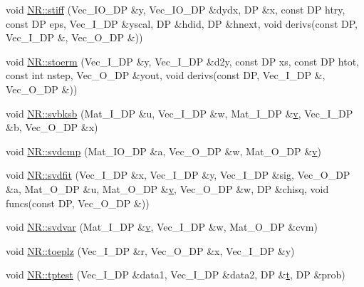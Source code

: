 \begin{DoxyCompactItemize}
\item 
void \mbox{\hyperlink{namespaceNR_afca47b534f9a096322597481b44a4ea6}{N\+R\+::stiff}} (Vec\+\_\+\+I\+O\+\_\+\+DP \&y, Vec\+\_\+\+I\+O\+\_\+\+DP \&dydx, DP \&x, const DP htry, const DP eps, Vec\+\_\+\+I\+\_\+\+DP \&yscal, DP \&hdid, DP \&hnext, void derivs(const DP, Vec\+\_\+\+I\+\_\+\+DP \&, Vec\+\_\+\+O\+\_\+\+DP \&))
\item 
void \mbox{\hyperlink{namespaceNR_a9a4beb20936c6e96b577a4f5e8c9d157}{N\+R\+::stoerm}} (Vec\+\_\+\+I\+\_\+\+DP \&y, Vec\+\_\+\+I\+\_\+\+DP \&d2y, const DP xs, const DP htot, const int nstep, Vec\+\_\+\+O\+\_\+\+DP \&yout, void derivs(const DP, Vec\+\_\+\+I\+\_\+\+DP \&, Vec\+\_\+\+O\+\_\+\+DP \&))
\item 
void \mbox{\hyperlink{namespaceNR_a5ae2173a7b10fd0f4e35baaad45f16f8}{N\+R\+::svbksb}} (Mat\+\_\+\+I\+\_\+\+DP \&u, Vec\+\_\+\+I\+\_\+\+DP \&w, Mat\+\_\+\+I\+\_\+\+DP \&\mbox{\hyperlink{adat__devel_2lib_2hadron_2hadron__timeslice_8cc_a716fc87f5e814be3ceee2405ed6ff22a}{v}}, Vec\+\_\+\+I\+\_\+\+DP \&b, Vec\+\_\+\+O\+\_\+\+DP \&x)
\item 
void \mbox{\hyperlink{namespaceNR_ad532389e2c426c3c38b860f4fd254103}{N\+R\+::svdcmp}} (Mat\+\_\+\+I\+O\+\_\+\+DP \&a, Vec\+\_\+\+O\+\_\+\+DP \&w, Mat\+\_\+\+O\+\_\+\+DP \&\mbox{\hyperlink{adat__devel_2lib_2hadron_2hadron__timeslice_8cc_a716fc87f5e814be3ceee2405ed6ff22a}{v}})
\item 
void \mbox{\hyperlink{namespaceNR_afe44878304edad27239234f84f643943}{N\+R\+::svdfit}} (Vec\+\_\+\+I\+\_\+\+DP \&x, Vec\+\_\+\+I\+\_\+\+DP \&y, Vec\+\_\+\+I\+\_\+\+DP \&sig, Vec\+\_\+\+O\+\_\+\+DP \&a, Mat\+\_\+\+O\+\_\+\+DP \&u, Mat\+\_\+\+O\+\_\+\+DP \&\mbox{\hyperlink{adat__devel_2lib_2hadron_2hadron__timeslice_8cc_a716fc87f5e814be3ceee2405ed6ff22a}{v}}, Vec\+\_\+\+O\+\_\+\+DP \&w, DP \&chisq, void funcs(const DP, Vec\+\_\+\+O\+\_\+\+DP \&))
\item 
void \mbox{\hyperlink{namespaceNR_a7718198c5af1e10344d7c8933fe579c5}{N\+R\+::svdvar}} (Mat\+\_\+\+I\+\_\+\+DP \&\mbox{\hyperlink{adat__devel_2lib_2hadron_2hadron__timeslice_8cc_a716fc87f5e814be3ceee2405ed6ff22a}{v}}, Vec\+\_\+\+I\+\_\+\+DP \&w, Mat\+\_\+\+O\+\_\+\+DP \&cvm)
\item 
void \mbox{\hyperlink{namespaceNR_a708603e68ca30567cab74fb4141a67f1}{N\+R\+::toeplz}} (Vec\+\_\+\+I\+\_\+\+DP \&r, Vec\+\_\+\+O\+\_\+\+DP \&x, Vec\+\_\+\+I\+\_\+\+DP \&y)
\item 
void \mbox{\hyperlink{namespaceNR_a12aa30fe12a4e3fe8fb89f946499954f}{N\+R\+::tptest}} (Vec\+\_\+\+I\+\_\+\+DP \&data1, Vec\+\_\+\+I\+\_\+\+DP \&data2, DP \&\mbox{\hyperlink{adat__devel_2lib_2hadron_2hadron__timeslice_8cc_ac310d9181e916ba43604099aee272c71}{t}}, DP \&prob)

\end{DoxyCompactItemize}
